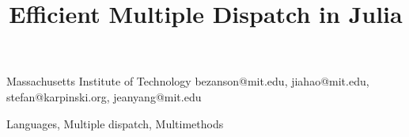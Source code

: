 \documentclass[9pt,cm,preprint]{sigplanconf}
\begin{document}


\title{Efficient Multiple Dispatch in Julia}

	{Massachusetts Institute of Technology}
	{bezanson@mit.edu, jiahao@mit.edu, stefan@karpinski.org, jeanyang@mit.edu}

\maketitle




\terms Languages, Multiple dispatch, Multimethods


\newcommand{\code}[1]{\texttt{#1}}
\newcommand{\package}[1]{\code{#1}\cite{#1}}
















\end{document}

